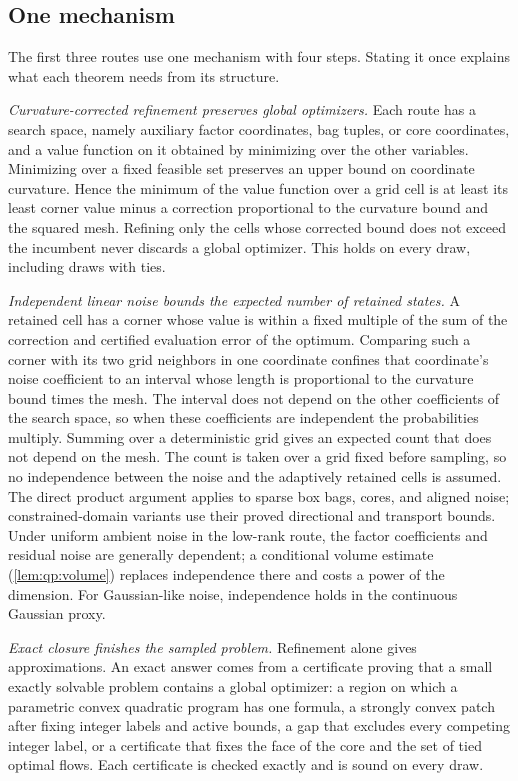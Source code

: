 \subsection{One mechanism}\label{sec:intro:mechanism}

The first three routes use one mechanism with four steps. Stating it once
explains what each theorem needs from its structure.

\emph{Curvature-corrected refinement preserves global optimizers.} Each route
has a search space, namely auxiliary factor coordinates, bag tuples, or core
coordinates, and a value function on it obtained by minimizing over the other
variables. Minimizing over a fixed feasible set preserves an upper bound on
coordinate curvature. Hence the minimum of the value function over a grid
cell is at least its least corner value minus a correction proportional to
the curvature bound and the squared mesh. Refining only the cells whose
corrected bound does not exceed the incumbent never discards a global
optimizer. This holds on every draw, including draws with ties.

\emph{Independent linear noise bounds the expected number of retained
states.} A retained cell has a corner whose value is within a fixed multiple
of the sum of the correction and certified evaluation error of the optimum.
Comparing such a corner with its two grid
neighbors in one coordinate confines that coordinate's noise coefficient to
an interval whose length is proportional to the curvature bound times the
mesh. The interval does not depend on the other coefficients of the search
space, so when these coefficients are independent the probabilities
multiply. Summing over a deterministic grid gives an expected count that
does not depend on the mesh. The count is taken over a grid fixed before
sampling, so no independence between the noise and the adaptively retained
cells is assumed. The direct product argument applies to sparse box bags,
cores, and aligned noise; constrained-domain variants use their proved
directional and transport bounds. Under uniform ambient noise in the
low-rank route, the factor coefficients and residual noise are generally
dependent; a conditional volume estimate
(\cref{lem:qp:volume}) replaces independence there and costs a power of
the dimension. For Gaussian-like noise, independence holds in the
continuous Gaussian proxy.

\emph{Exact closure finishes the sampled problem.} Refinement alone gives
approximations. An exact answer comes from a certificate proving that a
small exactly solvable problem contains a global optimizer: a region on
which a parametric convex quadratic program has one formula, a strongly
convex patch after fixing integer labels and active bounds, a gap that
excludes every competing integer label, or a certificate that fixes the face
of the core and the set of tied optimal flows. Each certificate is checked
exactly and is sound on every draw.

